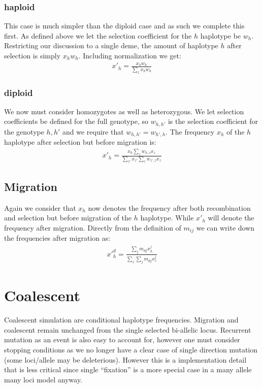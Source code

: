 \documentclass{article}
\begin{document}
\subsubsection{haploid}

This case is much simpler than the diploid case and as such we complete this
first. As defined above we let the selection coefficient for the $h$ haplotype
be $w_h$. Restricting our discussion to a single deme, the amount of haplotype
$h$ after selection is simply $x_hw_h$. Including normalization we get:
\begin{align}
	x'_h=\frac{x_hw_h}{\sum_z x_hw_h}
\end{align} 

\subsubsection{diploid}

We now must consider homozygotes as well as heterozygous. We let selection
coefficients be defined for the full genotype, so $w_{h,h'}$ is the selection
coefficient for the genotype $h,h'$ and we require that $w_{h,h'}=w_{h',h}$. The
frequency $x_h$ of the $h$ haplotype after selection but before migration is:
\begin{align}
	x'_h=\frac{x_h \sum_z w_{h,z}x_z}{\sum_{z'} x_{z'}\sum_z w_{z',z}x_z}
\end{align}

\subsection{Migration}

Again we consider that $x_h$ now denotes the frequency after both recombination
and selection but before migration of the $h$ haplotype. While $x'_h$ will
denote the frequency after migration. Directly from the definition of $m_{ij}$
we can write down the frequencies after migration as:
\begin{align}
	x'^d_h=\frac{\sum_j m_{dj} x^j_h}{\sum_z\sum_j m_{dj} x^j_z}
\end{align}

\section{Coalescent}

Coalescent simulation are conditional haplotype frequencies. Migration and
coalescent remain unchanged from the single selected bi-allelic locus. Recurrent
mutation as an event is also easy to account for, however one must consider
stopping conditions as we no longer have a clear case of single direction
mutation (some loci/allele may be deleterious). However this is a
implementation detail that is less critical since single ``fixation'' is a more
special case in a many allele many loci model anyway. 
\end{document}
